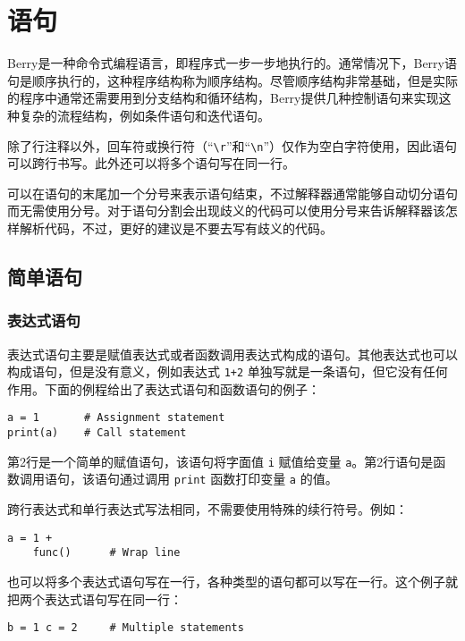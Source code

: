 \chapter{语句}

Berry是一种命令式编程语言，即程序式一步一步地执行的。通常情况下，Berry语句是顺序执行的，这种程序结构称为顺序结构。尽管顺序结构非常基础，但是实际的程序中通常还需要用到分支结构和循环结构，Berry提供几种控制语句来实现这种复杂的流程结构，例如条件语句和迭代语句。

除了行注释以外，回车符或换行符（``\texttt{\textbackslash r}''和``\texttt{\textbackslash n}''）仅作为空白字符使用，因此语句可以跨行书写。此外还可以将多个语句写在同一行。

可以在语句的末尾加一个分号来表示语句结束，不过解释器通常能够自动切分语句而无需使用分号。对于语句分割会出现歧义的代码可以使用分号来告诉解释器该怎样解析代码，不过，更好的建议是不要去写有歧义的代码。

\section{简单语句}

\subsection{表达式语句}

表达式语句主要是赋值表达式或者函数调用表达式构成的语句。其他表达式也可以构成语句，但是没有意义，例如表达式 \texttt{1+2} 单独写就是一条语句，但它没有任何作用。下面的例程给出了表达式语句和函数语句的例子：
\begin{lstlisting}[language=berry, numbers=none]
a = 1       # Assignment statement
print(a)    # Call statement
\end{lstlisting}
第2行是一个简单的赋值语句，该语句将字面值 \texttt{i} 赋值给变量 \texttt{a}。第2行语句是函数调用语句，该语句通过调用 \texttt{print} 函数打印变量 \texttt{a} 的值。

跨行表达式和单行表达式写法相同，不需要使用特殊的续行符号。例如：
\begin{lstlisting}[language=berry, numbers=none]
a = 1 +
    func()      # Wrap line
\end{lstlisting}
也可以将多个表达式语句写在一行，各种类型的语句都可以写在一行。这个例子就把两个表达式语句写在同一行：
\begin{lstlisting}[language=berry, numbers=none]
b = 1 c = 2     # Multiple statements
\end{lstlisting}

